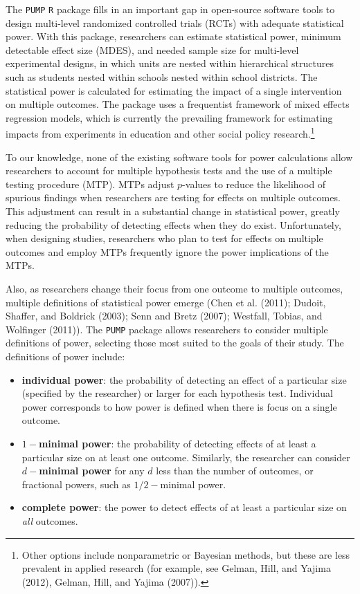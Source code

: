 \documentclass[
]{article}
\providecommand{\tightlist}{%
  \setlength{\itemsep}{0pt}\setlength{\parskip}{0pt}}
\begin{document}
The \texttt{PUMP} \texttt{R} package fills in an important gap in
open-source software tools to design multi-level randomized controlled
trials (RCTs) with adequate statistical power. With this package,
researchers can estimate statistical power, minimum detectable effect
size (MDES), and needed sample size for multi-level experimental
designs, in which units are nested within hierarchical structures such
as students nested within schools nested within school districts. The
statistical power is calculated for estimating the impact of a single
intervention on multiple outcomes. The package uses a frequentist
framework of mixed effects regression models, which is currently the
prevailing framework for estimating impacts from experiments in
education and other social policy research.\footnote{Other options
  include nonparametric or Bayesian methods, but these are less
  prevalent in applied research (for example, see Gelman, Hill, and
  Yajima (2012), Gelman, Hill, and Yajima (2007)).}

To our knowledge, none of the existing software tools for power
calculations allow researchers to account for multiple hypothesis tests
and the use of a multiple testing procedure (MTP). MTPs adjust
\(p\)-values to reduce the likelihood of spurious findings when
researchers are testing for effects on multiple outcomes. This
adjustment can result in a substantial change in statistical power,
greatly reducing the probability of detecting effects when they do
exist. Unfortunately, when designing studies, researchers who plan to
test for effects on multiple outcomes and employ MTPs frequently ignore
the power implications of the MTPs.

Also, as researchers change their focus from one outcome to multiple
outcomes, multiple definitions of statistical power emerge (Chen et al.
(2011); Dudoit, Shaffer, and Boldrick (2003); Senn and Bretz (2007);
Westfall, Tobias, and Wolfinger (2011)). The \texttt{PUMP} package
allows researchers to consider multiple definitions of power, selecting
those most suited to the goals of their study. The definitions of power
include:

\begin{itemize}
\tightlist
\item
  \textbf{individual power}: the probability of detecting an effect of a
  particular size (specified by the researcher) or larger for each
  hypothesis test. Individual power corresponds to how power is defined
  when there is focus on a single outcome.
\item
  \textbf{\(1-\)minimal power}: the probability of detecting effects of
  at least a particular size on at least one outcome. Similarly, the
  researcher can consider \textbf{\(d-\)minimal power} for any \(d\)
  less than the number of outcomes, or fractional powers, such as
  \(1/2-\)minimal power.
\item
  \textbf{complete power}: the power to detect effects of at least a
  particular size on \emph{all} outcomes.
\end{itemize}
\end{document}
